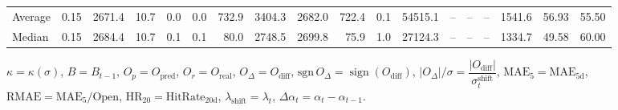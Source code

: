 \begin{threeparttable}
{\begin{tabular}{lrrrrrrrrrrrrrrrrr}
Average &     0.15 & 2671.4 &              10.7 &               0.0 &                0.0 &              732.9 &  3404.3 & 2682.0 &      722.4 &                      0.1 &             54515.1 &         -- &        -- &             -- &           1541.6 &           56.93 &                  55.50 \\
 Median &     0.15 & 2684.4 &              10.7 &               0.1 &                0.1 &               80.0 &  2748.5 & 2699.8 &       75.9 &                      1.0 &             27124.3 &         -- &        -- &             -- &           1334.7 &           49.58 &                  60.00 \\
\bottomrule
\end{tabular}
}
\begin{tablenotes}\footnotesize
\item $\kappa=\kappa(\sigma)$, $B=B_{t-1}$, $O_p=O_{\text{pred}}$, $O_r=O_{\text{real}}$, $O_\Delta=O_{\text{diff}}$, $\mathrm{sgn}\,O_\Delta=\operatorname{sign}(O_{\text{diff}})$, $|O_\Delta|/\sigma=\dfrac{|O_{\text{diff}}|}{\sigma_t^{\text{shift}}}$, $\mathrm{MAE}_5=\mathrm{MAE}_{5\text{d}}$, $\mathrm{RMAE}= \mathrm{MAE}_5 / \text{Open}$, $\mathrm{HR}_{20}=\mathrm{HitRate}_{20\text{d}}$, 
$\lambda_{\text{shift}}=\lambda_t$, 
$\Delta\alpha_t=\alpha_t-\alpha_{t-1}$.
\end{tablenotes}
\end{threeparttable}
\endgroup

